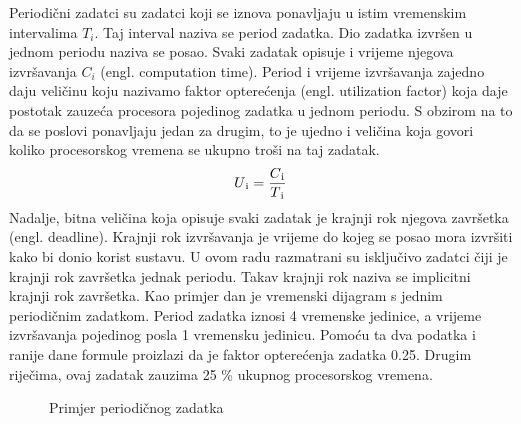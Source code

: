 \documentclass[../zavrsni.tex]{subfiles}
\begin{document}
Periodični zadatci su zadatci koji se iznova ponavljaju u istim vremenskim intervalima $T_i$. Taj interval naziva se period zadatka.
Dio zadatka izvršen u jednom periodu naziva se posao.
Svaki zadatak opisuje i vrijeme njegova izvršavanja $C_i$ (engl. computation time). Period i vrijeme izvršavanja zajedno daju veličinu 
koju nazivamo faktor opterećenja (engl. utilization factor) koja daje postotak zauzeća procesora pojedinog zadatka u jednom periodu. S obzirom na to da se poslovi
ponavljaju jedan za drugim, to je ujedno i veličina koja govori koliko procesorskog vremena se ukupno troši na taj zadatak.
\begin{equation*}
    U\textsubscript{i} = \frac{C\textsubscript{i}}{T\textsubscript{i}}
\end{equation*}
Nadalje, bitna veličina koja opisuje svaki zadatak je krajnji rok njegova završetka (engl. deadline). Krajnji rok izvršavanja je vrijeme 
do kojeg se posao mora izvršiti kako bi donio korist sustavu. U ovom radu razmatrani su 
isključivo zadatci čiji je krajnji rok završetka jednak periodu. Takav krajnji rok naziva se implicitni krajnji rok završetka. 
Kao primjer dan je vremenski dijagram s jednim periodičnim zadatkom.
Period zadatka iznosi 4 vremenske jedinice, a vrijeme izvršavanja pojedinog posla 1 vremensku jedinicu. Pomoću ta dva podatka i ranije 
dane formule proizlazi da je faktor opterećenja zadatka 0.25. Drugim riječima, ovaj zadatak zauzima 25 \% ukupnog procesorskog vremena.

\begin{figure}[h]
    \centering

    \begin{RTGrid}[width=13cm]{1}{8}

  

    \end{RTGrid}

    \caption{Primjer periodičnog zadatka}
    \label{fig:ex1}
  \end{figure}
\end{document}
